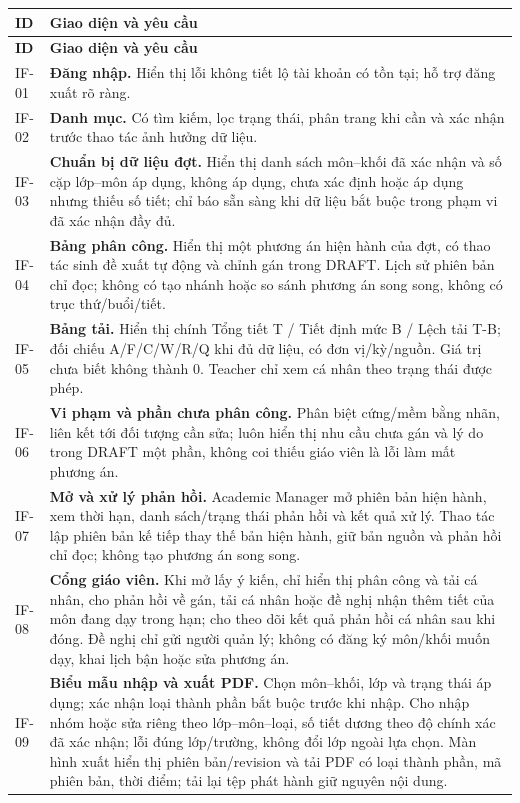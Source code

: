 \documentclass[12pt,a4paper]{report}
\begin{document}
\begin{longtable}{|p{1.45cm}|p{12.5cm}|}
\hline
\textbf{ID} & \textbf{Giao diện và yêu cầu} \\\hline
\endfirsthead
\hline
\textbf{ID} & \textbf{Giao diện và yêu cầu} \\\hline
\endhead
IF-01 & \textbf{Đăng nhập.} Hiển thị lỗi không tiết lộ tài khoản có tồn tại; hỗ trợ đăng xuất rõ ràng. \\\hline
IF-02 & \textbf{Danh mục.} Có tìm kiếm, lọc trạng thái, phân trang khi cần và xác nhận trước thao tác ảnh hưởng dữ liệu. \\\hline
IF-03 & \textbf{Chuẩn bị dữ liệu đợt.} Hiển thị danh sách môn--khối đã xác nhận và số cặp lớp--môn áp dụng, không áp dụng, chưa xác định hoặc áp dụng nhưng thiếu số tiết; chỉ báo sẵn sàng khi dữ liệu bắt buộc trong phạm vi đã xác nhận đầy đủ. \\\hline
IF-04 & \textbf{Bảng phân công.} Hiển thị một phương án hiện hành của đợt, có thao tác sinh đề xuất tự động và chỉnh gán trong DRAFT. Lịch sử phiên bản chỉ đọc; không có tạo nhánh hoặc so sánh phương án song song, không có trục thứ/buổi/tiết. \\\hline
IF-05 & \textbf{Bảng tải.} Hiển thị chính Tổng tiết T / Tiết định mức B / Lệch tải T-B; đối chiếu A/F/C/W/R/Q khi đủ dữ liệu, có đơn vị/kỳ/nguồn. Giá trị chưa biết không thành 0. Teacher chỉ xem cá nhân theo trạng thái được phép. \\\hline
IF-06 & \textbf{Vi phạm và phần chưa phân công.} Phân biệt cứng/mềm bằng nhãn, liên kết tới đối tượng cần sửa; luôn hiển thị nhu cầu chưa gán và lý do trong DRAFT một phần, không coi thiếu giáo viên là lỗi làm mất phương án. \\\hline
IF-07 & \textbf{Mở và xử lý phản hồi.} Academic Manager mở phiên bản hiện hành, xem thời hạn, danh sách/trạng thái phản hồi và kết quả xử lý. Thao tác lập phiên bản kế tiếp thay thế bản hiện hành, giữ bản nguồn và phản hồi chỉ đọc; không tạo phương án song song. \\\hline
IF-08 & \textbf{Cổng giáo viên.} Khi mở lấy ý kiến, chỉ hiển thị phân công và tải cá nhân, cho phản hồi về gán, tải cá nhân hoặc đề nghị nhận thêm tiết của môn đang dạy trong hạn; cho theo dõi kết quả phản hồi cá nhân sau khi đóng. Đề nghị chỉ gửi người quản lý; không có đăng ký môn/khối muốn dạy, khai lịch bận hoặc sửa phương án. \\\hline
IF-09 & \textbf{Biểu mẫu nhập và xuất PDF.} Chọn môn--khối, lớp và trạng thái áp dụng; xác nhận loại thành phần bắt buộc trước khi nhập. Cho nhập nhóm hoặc sửa riêng theo lớp--môn--loại, số tiết dương theo độ chính xác đã xác nhận; lỗi đúng lớp/trường, không đổi lớp ngoài lựa chọn. Màn hình xuất hiển thị phiên bản/revision và tải PDF có loại thành phần, mã phiên bản, thời điểm; tải lại tệp phát hành giữ nguyên nội dung. \\\hline
\end{longtable}
\end{document}
